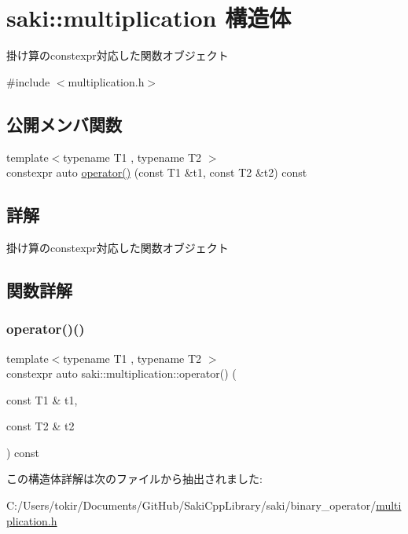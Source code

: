 \hypertarget{structsaki_1_1multiplication}{}\section{saki\+:\+:multiplication 構造体}
\label{structsaki_1_1multiplication}


掛け算のconstexpr対応した関数オブジェクト  




{\ttfamily \#include $<$multiplication.\+h$>$}

\subsection*{公開メンバ関数}
\begin{DoxyCompactItemize}
\item 
{\footnotesize template$<$typename T1 , typename T2 $>$ }\\constexpr auto \mbox{\hyperlink{structsaki_1_1multiplication_ad7c9cfc08911b6db3ea95d4cfd5ffa7f}{operator()}} (const T1 \&t1, const T2 \&t2) const
\end{DoxyCompactItemize}


\subsection{詳解}
掛け算のconstexpr対応した関数オブジェクト 

\subsection{関数詳解}
\mbox{\label{structsaki_1_1multiplication_ad7c9cfc08911b6db3ea95d4cfd5ffa7f}} 
\subsubsection{\texorpdfstring{operator()()}{operator()()}}
{\footnotesize\ttfamily template$<$typename T1 , typename T2 $>$ \\
constexpr auto saki\+::multiplication\+::operator() (\begin{DoxyParamCaption}\item[{const T1 \&}]{t1,  }\item[{const T2 \&}]{t2 }\end{DoxyParamCaption}) const\hspace{0.3cm}{\ttfamily [inline]}}



この構造体詳解は次のファイルから抽出されました\+:\begin{DoxyCompactItemize}
\item 
C\+:/\+Users/tokir/\+Documents/\+Git\+Hub/\+Saki\+Cpp\+Library/saki/binary\+\_\+operator/\mbox{\hyperlink{multiplication_8h}{multiplication.\+h}}\end{DoxyCompactItemize}
